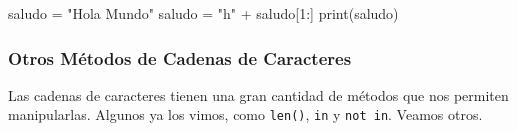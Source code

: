 \documentclass[
  letterpaper,
  DIV=11,
  numbers=noendperiod]{scrreprt}
\newenvironment{Shaded}{\begin{snugshade}}{\end{snugshade}}
\newcommand{\BuiltInTok}[1]{\textcolor[rgb]{0.00,0.23,0.31}{#1}}
\newcommand{\DecValTok}[1]{\textcolor[rgb]{0.68,0.00,0.00}{#1}}
\newcommand{\NormalTok}[1]{\textcolor[rgb]{0.00,0.23,0.31}{#1}}
\newcommand{\OperatorTok}[1]{\textcolor[rgb]{0.37,0.37,0.37}{#1}}
\newcommand{\StringTok}[1]{\textcolor[rgb]{0.13,0.47,0.30}{#1}}
\begin{document}
\begin{Shaded}
\begin{Highlighting}[]
\NormalTok{saludo }\OperatorTok{=} \StringTok{"Hola Mundo"}
\NormalTok{saludo }\OperatorTok{=} \StringTok{"h"} \OperatorTok{+}\NormalTok{ saludo[}\DecValTok{1}\NormalTok{:]}
\BuiltInTok{print}\NormalTok{(saludo)}
\end{Highlighting}
\end{Shaded}

\subsubsection{Otros Métodos de Cadenas de
Caracteres}\label{otros-muxe9todos-de-cadenas-de-caracteres}

Las cadenas de caracteres tienen una gran cantidad de métodos que nos
permiten manipularlas. Algunos ya los vimos, como \texttt{len()},
\texttt{in} y \texttt{not\ in}. Veamos otros.
\end{document}

